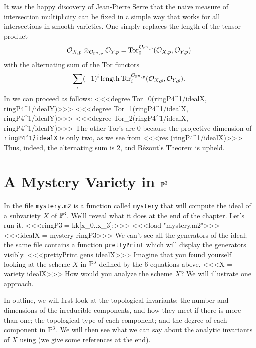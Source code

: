 It was the happy discovery
of Jean-Pierre Serre \cite[V.B.3]{Serre} that the naive 
measure of intersection multiplicity can be fixed in a simple
way that works for all intersections in smooth varieties.
One simply replaces the length of the tensor product
$$
\cO_{X,p}\otimes_{\cO_{\P^n,p}} \cO_{Y,p}=
\mathop{\rm Tor}\nolimits_0^{\cO_{{\P^n},p} }
               (\cO_{X,p}, \cO_{Y,p})
$$
with the alternating sum of the Tor functors
$$
\sum_i(-1)^i \mathop{\rm length}
\mathop{\rm Tor}\nolimits_i^{\cO_{{\P^n},p} }
               (\cO_{X,p}, \cO_{Y,p}).
$$
In \Mtwo we can proceed as follows:
<<<degree Tor_0(ringP4^1/idealX, ringP4^1/idealY)>>>
<<<degree Tor_1(ringP4^1/idealX, ringP4^1/idealY)>>>
<<<degree Tor_2(ringP4^1/idealX, ringP4^1/idealY)>>>
The other Tor's are 0 because the projective
dimension of {\tt ringP4\char`\^1/idealX} is only two,
as we see from
<<<res (ringP4^1/idealX)>>>
Thus, indeed, the alternating sum is 2, and B\'ezout's
Theorem is upheld.

\section{A Mystery Variety in $\P^3$}

In the file {\tt mystery.m2} is a function called {\tt mystery} that will
compute the ideal of a subvariety $X$ of $\P^3$.  We'll reveal what it does
at the end of the chapter.  Let's run it.
<<<ringP3 = kk[x_0..x_3];>>>
<<<load "mystery.m2">>>
<<<idealX = mystery ringP3>>>
We can't see all the generators of the ideal; the same file contains a
function {\tt prettyPrint} which will display the generators visibly.
<<<prettyPrint gens idealX>>>
Imagine that you found yourself looking at the
scheme $X$ in $\P^3$ defined by the 6 equations above.
<<<X = variety idealX>>>
How would you analyze the scheme $X$? 
We will illustrate one approach.

In outline, we will first look at the topological invariants:
the number and dimensions of the irreducible components,
and how they meet if there is more than one; the topological
type of each component; and the degree of each component in
$\P^3$. We will then see what we can say about the analytic
invariants of $X$ using  (we give some references
at the end).

